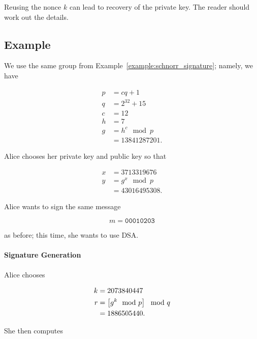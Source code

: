 Reusing the \gls{nonce} $k$ can lead to recovery of the private key.
The reader should work out the details.

\subsection{Example}

\begin{example}

We use the same \gls{group} from Example~\ref{example:schnorr_signature};
namely, we have

\begin{align}
    p &= cq + 1 \nonumber\\
    q &= 2^{32} + 15 \nonumber\\
    c &= 12 \nonumber\\
    h &= 7 \nonumber\\
    g &= h^{c} \mod p \nonumber\\
        &= 13841287201.
\end{align}

Alice chooses her private key and public key so that

\begin{align}
    x &= 3713319676 \nonumber\\
    y &= g^{x} \mod p \nonumber\\
        &= 43016495308.
\end{align}

\noindent
Alice wants to sign the same message

\begin{equation}
    m = \texttt{00010203}
\end{equation}

\noindent
as before; this time, she wants to use DSA.

\paragraph{Signature Generation}
Alice chooses

\begin{align}
    k &= 2073840447 \nonumber\\
    r &= \left[ g^{k} \mod p \right] \mod q \nonumber\\
        &= 1886505440.
\end{align}

\noindent
She then computes


\end{example}
